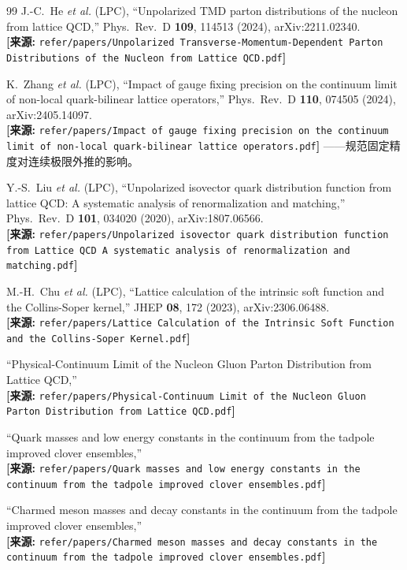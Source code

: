 \documentclass[12pt,a4paper]{ctexart}
\theoremstyle{definition}
\begin{document}
\begin{thebibliography}{99}
J.-C.~He \textit{et al.} (LPC),
``Unpolarized TMD parton distributions of the nucleon from lattice QCD,''
Phys.\ Rev.\ D \textbf{109}, 114513 (2024), arXiv:2211.02340.
\\\textbf{[来源:} \texttt{refer/papers/Unpolarized Transverse-Momentum-Dependent Parton Distributions of the Nucleon from Lattice QCD.pdf}\textbf{]}

K.~Zhang \textit{et al.} (LPC),
``Impact of gauge fixing precision on the continuum limit of non-local quark-bilinear lattice operators,''
Phys.\ Rev.\ D \textbf{110}, 074505 (2024), arXiv:2405.14097.
\\\textbf{[来源:} \texttt{refer/papers/Impact of gauge fixing precision on the continuum limit of non-local quark-bilinear lattice operators.pdf}\textbf{]}
——规范固定精度对连续极限外推的影响。

Y.-S.~Liu \textit{et al.} (LPC),
``Unpolarized isovector quark distribution function from lattice QCD: A systematic analysis of renormalization and matching,''
Phys.\ Rev.\ D \textbf{101}, 034020 (2020), arXiv:1807.06566.
\\\textbf{[来源:} \texttt{refer/papers/Unpolarized isovector quark distribution function from Lattice QCD A systematic analysis of renormalization and matching.pdf}\textbf{]}

M.-H.~Chu \textit{et al.} (LPC),
``Lattice calculation of the intrinsic soft function and the Collins-Soper kernel,''
JHEP \textbf{08}, 172 (2023), arXiv:2306.06488.
\\\textbf{[来源:} \texttt{refer/papers/Lattice Calculation of the Intrinsic Soft Function and the Collins-Soper Kernel.pdf}\textbf{]}

``Physical-Continuum Limit of the Nucleon Gluon Parton Distribution from Lattice QCD,''
\\\textbf{[来源:} \texttt{refer/papers/Physical-Continuum Limit of the Nucleon Gluon Parton Distribution from Lattice QCD.pdf}\textbf{]}

``Quark masses and low energy constants in the continuum from the tadpole improved clover ensembles,''
\\\textbf{[来源:} \texttt{refer/papers/Quark masses and low energy constants in the continuum from the tadpole improved clover ensembles.pdf}\textbf{]}

``Charmed meson masses and decay constants in the continuum from the tadpole improved clover ensembles,''
\\\textbf{[来源:} \texttt{refer/papers/Charmed meson masses and decay constants in the continuum from the tadpole improved clover ensembles.pdf}\textbf{]}


\end{thebibliography}
\end{document}
